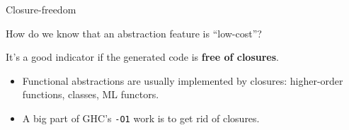 \documentclass[dvipsnames,aspectratio=169]{beamer}
\newcommand{\ttt}[1]{{\texttt{#1}}}
\theoremstyle{remark}
\begin{document}
\begin{frame}[fragile]{Closure-freedom}

How do we know that an abstraction feature is ``low-cost''?
\vspace{1em}

It's a good indicator if the generated code is \textbf{free of closures}.
\vspace{1em}
\begin{itemize}
  \item Functional abstractions are usually implemented by closures:
        higher-order functions, classes, ML functors.
  \item A big part of GHC's \texttt{-O1} work is to get rid of closures.
\end{itemize}






\end{frame}



\end{document}

